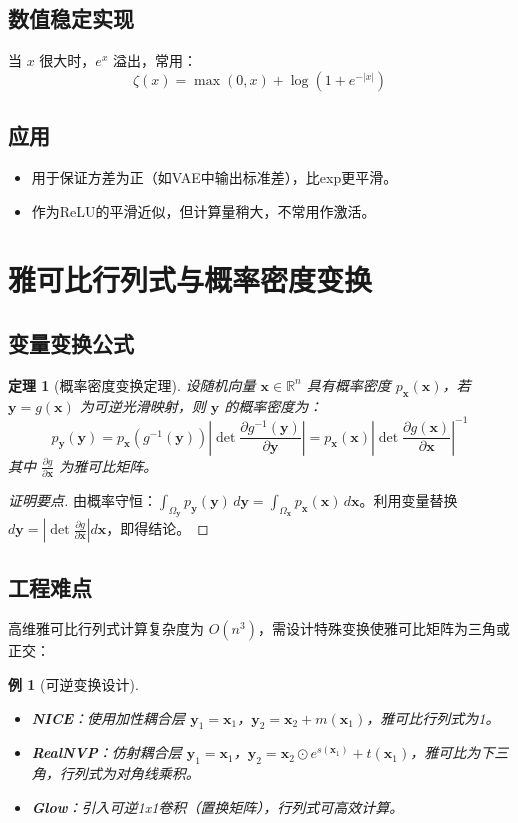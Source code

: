 \documentclass[UTF8, 10pt]{ctexart}
\newtheorem{theorem}{定理}[section]
\newtheorem{example}{例}[section]
\newcommand{\R}{\mathbb{R}}
\begin{document}
\subsection{数值稳定实现}
当 $x$ 很大时，$e^x$ 溢出，常用：
\[
\zeta(x) = \max(0,x) + \log(1 + e^{-|x|})
\]

\subsection{应用}
\begin{itemize}
    \item 用于保证方差为正（如VAE中输出标准差），比exp更平滑。
    \item 作为ReLU的平滑近似，但计算量稍大，不常用作激活。
\end{itemize}

\section{雅可比行列式与概率密度变换}
\subsection{变量变换公式}
\begin{theorem}[概率密度变换定理]
设随机向量 $\bm{x} \in \R^n$ 具有概率密度 $p_{\bm{x}}(\bm{x})$，若 $\bm{y} = g(\bm{x})$ 为可逆光滑映射，则 $\bm{y}$ 的概率密度为：
\[
p_{\bm{y}}(\bm{y}) = p_{\bm{x}}(g^{-1}(\bm{y})) \left| \det \frac{\partial g^{-1}(\bm{y})}{\partial \bm{y}} \right| = p_{\bm{x}}(\bm{x}) \left| \det \frac{\partial g(\bm{x})}{\partial \bm{x}} \right|^{-1}
\]
其中 $\frac{\partial g}{\partial \bm{x}}$ 为雅可比矩阵。
\end{theorem}

\begin{proof}[证明要点]
由概率守恒：$\int_{\Omega_{\bm{y}}} p_{\bm{y}}(\bm{y})\, d\bm{y} = \int_{\Omega_{\bm{x}}} p_{\bm{x}}(\bm{x})\, d\bm{x}$。利用变量替换 $d\bm{y} = \left|\det \frac{\partial g}{\partial \bm{x}}\right| d\bm{x}$，即得结论。
\end{proof}

\subsection{工程难点}
高维雅可比行列式计算复杂度为 $O(n^3)$，需设计特殊变换使雅可比矩阵为三角或正交：

\begin{example}[可逆变换设计]
\begin{itemize}
    \item \textbf{NICE}：使用加性耦合层 $\bm{y}_1 = \bm{x}_1$，$\bm{y}_2 = \bm{x}_2 + m(\bm{x}_1)$，雅可比行列式为1。
    \item \textbf{RealNVP}：仿射耦合层 $\bm{y}_1 = \bm{x}_1$，$\bm{y}_2 = \bm{x}_2 \odot e^{s(\bm{x}_1)} + t(\bm{x}_1)$，雅可比为下三角，行列式为对角线乘积。
    \item \textbf{Glow}：引入可逆1x1卷积（置换矩阵），行列式可高效计算。
\end{itemize}
\end{example}
\end{document}
